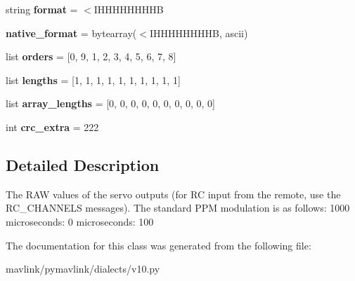 \begin{DoxyCompactItemize}
\item 
\mbox{\label{classpymavlink_1_1dialects_1_1v10_1_1MAVLink__servo__output__raw__message_ae449397509791739649067a922eb7622}} 
string {\bfseries format} = \textquotesingle{}$<$I\+H\+H\+H\+H\+H\+H\+H\+HB\textquotesingle{}
\item 
\mbox{\label{classpymavlink_1_1dialects_1_1v10_1_1MAVLink__servo__output__raw__message_af13dcf54045001e873f37a6643a0579e}} 
{\bfseries native\+\_\+format} = bytearray(\textquotesingle{}$<$I\+H\+H\+H\+H\+H\+H\+H\+HB\textquotesingle{}, \textquotesingle{}ascii\textquotesingle{})
\item 
\mbox{\label{classpymavlink_1_1dialects_1_1v10_1_1MAVLink__servo__output__raw__message_ad47437e7419a97536e821421d906c985}} 
list {\bfseries orders} = \mbox{[}0, 9, 1, 2, 3, 4, 5, 6, 7, 8\mbox{]}
\item 
\mbox{\label{classpymavlink_1_1dialects_1_1v10_1_1MAVLink__servo__output__raw__message_a3c56e713631a9d4d5287a14f356b81ad}} 
list {\bfseries lengths} = \mbox{[}1, 1, 1, 1, 1, 1, 1, 1, 1, 1\mbox{]}
\item 
\mbox{\label{classpymavlink_1_1dialects_1_1v10_1_1MAVLink__servo__output__raw__message_aa03940c4dc406154893b9a68625c8d34}} 
list {\bfseries array\+\_\+lengths} = \mbox{[}0, 0, 0, 0, 0, 0, 0, 0, 0, 0\mbox{]}
\item 
\mbox{\label{classpymavlink_1_1dialects_1_1v10_1_1MAVLink__servo__output__raw__message_aed7179f9aff6889099e012585aae67ea}} 
int {\bfseries crc\+\_\+extra} = 222
\end{DoxyCompactItemize}


\subsection{Detailed Description}
\begin{DoxyVerb}The RAW values of the servo outputs (for RC input from the
remote, use the RC_CHANNELS messages). The standard PPM
modulation is as follows: 1000 microseconds: 0%
microseconds: 100%
\end{DoxyVerb}
 

The documentation for this class was generated from the following file\+:\begin{DoxyCompactItemize}
\item 
mavlink/pymavlink/dialects/v10.\+py\end{DoxyCompactItemize}
